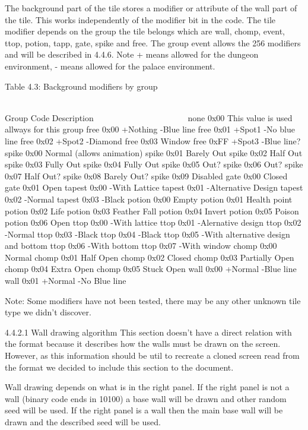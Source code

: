 The background part of the tile stores a modifier or attribute of the
 wall part of the tile. This works independently of the modifier bit in the
 code. The tile  modifier depends on the group the tile belongs which are
 wall, chomp, event, ttop, potion, tapp, gate, spike and free.
 The group event allows the 256 modifiers and will be described in 4.4.6.
 Note + means allowed for the dungeon environment, - means allowed for the
 palace environment.

                   Table 4.3: Background modifiers by group
                   ~~~~~~~~~~~~~~~~~~~~~~~~~~~~~~~~~~~~~~~~

  Group  Code Description
  ~~~~~  ~~~~ ~~~~~~~~~~~
  none   0x00 This value is used allways for this group
  free   0x00 +Nothing -Blue line
  free   0x01 +Spot1   -No blue line
  free   0x02 +Spot2   -Diamond
  free   0x03 Window
  free   0xFF +Spot3   -Blue line?
  spike  0x00 Normal (allows animation)
  spike  0x01 Barely Out
  spike  0x02 Half Out
  spike  0x03 Fully Out
  spike  0x04 Fully Out
  spike  0x05 Out?
  spike  0x06 Out?
  spike  0x07 Half Out?
  spike  0x08 Barely Out?
  spike  0x09 Disabled
  gate   0x00 Closed
  gate   0x01 Open
  tapest 0x00 -With Lattice
  tapest 0x01 -Alternative Design
  tapest 0x02 -Normal
  tapest 0x03 -Black
  potion 0x00 Empty
  potion 0x01 Health point
  potion 0x02 Life
  potion 0x03 Feather Fall
  potion 0x04 Invert
  potion 0x05 Poison
  potion 0x06 Open
  ttop   0x00 -With lattice
  ttop   0x01 -Alernative design
  ttop   0x02 -Normal
  ttop   0x03 -Black
  ttop   0x04 -Black
  ttop   0x05 -With alternative design and bottom
  ttop   0x06 -With bottom
  ttop   0x07 -With window
  chomp  0x00 Normal
  chomp  0x01 Half Open
  chomp  0x02 Closed
  chomp  0x03 Partially Open
  chomp  0x04 Extra Open
  chomp  0x05 Stuck Open
  wall   0x00 +Normal  -Blue line
  wall   0x01 +Normal  -No Blue line

 Note: Some modifiers have not been tested, there may be any other unknown
       tile type we didn't discover.


4.4.2.1 Wall drawing algorithm
 This section doesn't have a direct relation with the format because it
 describes how the walls must be drawn on the screen. However, as this
 information should be util to recreate a cloned screen read from the
 format we decided to include this section to the document.

 Wall drawing depends on what is in the right panel. If the right panel
 is not a wall (binary code ends in 10100) a base wall will be drawn and
 other random seed will be used. If the right panel is a wall then the main
 base wall will be drawn and the described seed will be used.

